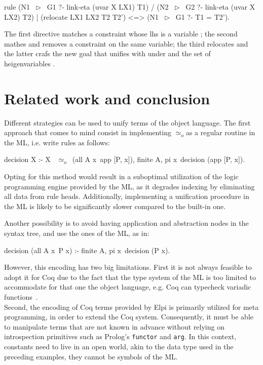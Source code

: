 \documentclass[sigconf,natbib=false,review]{acmart}
\newcommand{\UnifRel}{\ensuremath{\simeq}}
\newcommand{\Uo}{\texorpdfstring{\ensuremath{\UnifRel_o}\xspace}{unif\_o}}
\newcommand{\lhs}{lhs\xspace}
\begin{document}
\begin{elpicode}
  rule (N1 ~$\triangleright$~ G1 ?- link-eta (uvar X LX1) T1)   %
    /  (N2 ~$\triangleright$~ G2 ?- link-eta (uvar X LX2) T2)   %
    |  (relocate LX1 LX2 T2 T2')               %
   <=> (N1 ~$\triangleright$~ G1 ?- T1 = T2').                  %
\end{elpicode}

\noindent
The first directive matches a constraint
whose \lhs is a variable ; the second mathes and removes
a constraint on the same variable; the third
relocates  and the latter crafs the new goal that unifies
 with  under  and the set of
heigenvariables .


\noindent
\section{Related work and conclusion}

Different strategies can be used to unify terms of the object language.
The first approach that comes to mind consist in implementing \Uo as a
regular routine in the ML, i.e. write rules as follows:

\begin{elpicode}
  decision X :- X ~\Uo~(all A x\ app [P, x]), finite A,
    pi x\ decision (app [P, x]).
\end{elpicode}

\noindent
Opting for this method would result in a suboptimal utilization of the logic
programming engine provided by the ML, as it degrades indexing by
eliminating all data from rule heads. Additionally,
implementing a unification procedure in the ML is likely to be significantly
slower compared to the built-in one.

Another possibility is to avoid having application and abstraction nodes
in the syntax tree, and use the ones of the ML, as in:

\begin{elpicode}
decision (all A x\ P x) :- finite A, pi x\ decision (P x).
\end{elpicode}

\noindent
However, this encoding has two big limitations. First it is
not always feasible to adopt it for Coq due to the fact that the type system
of the ML is too limited to accommodate for that one the object language,
e.g. Coq can typecheck variadic functions~\cite{cpdt}. \\
Second, the encoding of Coq terms provided by Elpi is primarily utilized for meta
programming, in order to extend the Coq system. Consequently, it must be able to
manipulate terms that are not known in advance
without relying on introspection primitives such as Prolog's
\texttt{functor} and \texttt{arg}. In this context, constants need to live in
an open world, akin to the  data type used in the preceding
examples, they cannot be symbols of the ML.
\end{document}
